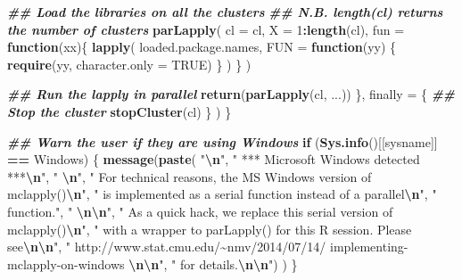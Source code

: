\documentclass[
  12pt,
  french,
  a4paper,
  extrafontsizes,onecolumn,openright
  ]{memoir}
\newenvironment{Shaded}{\begin{snugshade}}{\end{snugshade}}
\newcommand{\AttributeTok}[1]{\textcolor[rgb]{0.13,0.29,0.53}{#1}}
\newcommand{\ConstantTok}[1]{\textcolor[rgb]{0.56,0.35,0.01}{#1}}
\newcommand{\ControlFlowTok}[1]{\textcolor[rgb]{0.13,0.29,0.53}{\textbf{#1}}}
\newcommand{\DecValTok}[1]{\textcolor[rgb]{0.00,0.00,0.81}{#1}}
\newcommand{\DocumentationTok}[1]{\textcolor[rgb]{0.56,0.35,0.01}{\textbf{\textit{#1}}}}
\newcommand{\FunctionTok}[1]{\textcolor[rgb]{0.13,0.29,0.53}{\textbf{#1}}}
\newcommand{\NormalTok}[1]{#1}
\newcommand{\SpecialCharTok}[1]{\textcolor[rgb]{0.81,0.36,0.00}{\textbf{#1}}}
\newcommand{\StringTok}[1]{\textcolor[rgb]{0.31,0.60,0.02}{#1}}
\begin{document}
\begin{Shaded}
\begin{Highlighting}[]
      \DocumentationTok{\#\# Load the libraries on all the clusters}
      \DocumentationTok{\#\# N.B. length(cl) returns the number of clusters}
      \FunctionTok{parLapply}\NormalTok{(}
        \AttributeTok{cl =}\NormalTok{ cl, }
        \AttributeTok{X =} \DecValTok{1}\SpecialCharTok{:}\FunctionTok{length}\NormalTok{(cl), }
        \AttributeTok{fun =} \ControlFlowTok{function}\NormalTok{(xx)\{}
          \FunctionTok{lapply}\NormalTok{(}
\NormalTok{            loaded.package.names, }
            \AttributeTok{FUN =} \ControlFlowTok{function}\NormalTok{(yy) \{}
              \FunctionTok{require}\NormalTok{(yy, }\AttributeTok{character.only =} \ConstantTok{TRUE}\NormalTok{)}
\NormalTok{            \}}
\NormalTok{          )}
\NormalTok{        \}}
\NormalTok{      )}
      
      \DocumentationTok{\#\# Run the lapply in parallel }
      \FunctionTok{return}\NormalTok{(}\FunctionTok{parLapply}\NormalTok{(cl, ...))}
\NormalTok{    \}, }
    \AttributeTok{finally =}\NormalTok{ \{        }
      \DocumentationTok{\#\# Stop the cluster}
      \FunctionTok{stopCluster}\NormalTok{(cl)}
\NormalTok{    \}}
\NormalTok{  )}
\NormalTok{\}}

\DocumentationTok{\#\# Warn the user if they are using Windows}
\ControlFlowTok{if}\NormalTok{ (}\FunctionTok{Sys.info}\NormalTok{()[[}\StringTok{\textquotesingle{}sysname\textquotesingle{}}\NormalTok{]] }\SpecialCharTok{==} \StringTok{\textquotesingle{}Windows\textquotesingle{}}\NormalTok{) \{}
  \FunctionTok{message}\NormalTok{(}\FunctionTok{paste}\NormalTok{(}
    \StringTok{"}\SpecialCharTok{\textbackslash{}n}\StringTok{"}\NormalTok{, }
    \StringTok{"   *** Microsoft Windows detected ***}\SpecialCharTok{\textbackslash{}n}\StringTok{"}\NormalTok{,}
    \StringTok{"   }\SpecialCharTok{\textbackslash{}n}\StringTok{"}\NormalTok{,}
    \StringTok{"   For technical reasons, the MS Windows version of mclapply()}\SpecialCharTok{\textbackslash{}n}\StringTok{"}\NormalTok{,}
    \StringTok{"   is implemented as a serial function instead of a parallel}\SpecialCharTok{\textbackslash{}n}\StringTok{"}\NormalTok{,}
    \StringTok{"   function."}\NormalTok{,}
    \StringTok{"   }\SpecialCharTok{\textbackslash{}n\textbackslash{}n}\StringTok{"}\NormalTok{,}
    \StringTok{"   As a quick hack, we replace this serial version of mclapply()}\SpecialCharTok{\textbackslash{}n}\StringTok{"}\NormalTok{,}
    \StringTok{"   with a wrapper to parLapply() for this R session. Please see}\SpecialCharTok{\textbackslash{}n\textbackslash{}n}\StringTok{"}\NormalTok{,}
    \StringTok{"     http://www.stat.cmu.edu/\textasciitilde{}nmv/2014/07/14/}
\StringTok{    implementing{-}mclapply{-}on{-}windows }\SpecialCharTok{\textbackslash{}n\textbackslash{}n}\StringTok{"}\NormalTok{,}
    \StringTok{"   for details.}\SpecialCharTok{\textbackslash{}n\textbackslash{}n}\StringTok{"}\NormalTok{)}
\NormalTok{  )}
\NormalTok{\}}


\end{Highlighting}
\end{Shaded}
\end{document}
